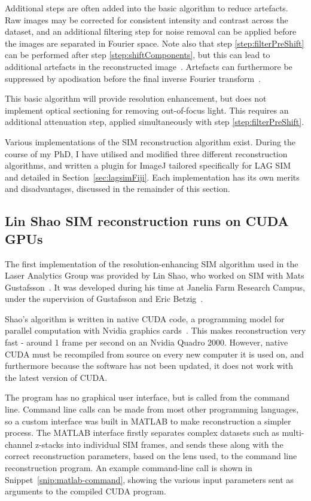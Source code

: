 Additional steps are often added into the basic algorithm to reduce artefacts.
Raw images may be corrected for consistent intensity and contrast across the dataset, and an additional filtering step for noise removal can be applied before the images are separated in Fourier space.
Note also that step \ref{step:filterPreShift} can be performed after step \ref{step:shiftComponents}, but this can lead to additional artefacts in the reconstructed image~\cite{gustafsson2008three}.
Artefacts can furthermore be suppressed by apodisation before the final inverse Fourier transform~\cite{gustafsson2008three}.

This basic algorithm will provide resolution enhancement, but does not implement optical sectioning for removing out-of-focus light.
This requires an additional attenuation step, applied simultaneously with step \ref{step:filterPreShift}.

Various implementations of the SIM reconstruction algorithm exist.
During the course of my PhD, I have utilised and modified three different reconstruction algorithms, and written a plugin for ImageJ tailored specifically for LAG SIM and detailed in Section~\ref{sec:lagsimFiji}.
Each implementation has its own merits and disadvantages, discussed in the remainder of this section.

\subsection{Lin Shao SIM reconstruction runs on CUDA GPUs} \label{sec:shao-recon}
The first implementation of the resolution-enhancing SIM algorithm used in the Laser Analytics Group was provided by Lin Shao, who worked on SIM with Mats Gustafsson~\cite{shao2011super}.
It was developed during his time at Janelia Farm Research Campus, under the supervision of Gustafsson and Eric Betzig~\cite{beach2014nonmuscle}.

Shao's algorithm is written in native CUDA code, a programming model for parallel computation with Nvidia graphics cards~\cite{sanders2010cuda}.
This makes reconstruction very fast - around 1 frame per second on an Nvidia Quadro 2000.
However, native CUDA must be recompiled from source on every new computer it is used on, and furthermore because the software has not been updated, it does not work with the latest version of CUDA.

The program has no graphical user interface, but is called from the command line.
Command line calls can be made from most other programming languages, so a custom interface was built in MATLAB to make reconstruction a simpler process.
The MATLAB interface firstly separates complex datasets such as multi-channel z-stacks into individual SIM frames, and sends these along with the correct reconstruction parameters, based on the lens used, to the command line reconstruction program.
An example command-line call is shown in Snippet~\ref{snip:matlab-command}, showing the various input parameters sent as arguments to the compiled CUDA program. 

